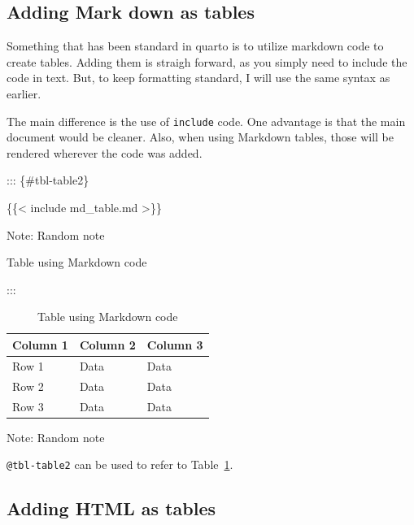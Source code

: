 \documentclass[
  12pt,
]{article}
\newenvironment{Shaded}{\begin{snugshade}}{\end{snugshade}}
\newcommand{\NormalTok}[1]{\textcolor[rgb]{0.00,0.23,0.31}{#1}}
\begin{document}
\subsection{Adding Mark down as
tables}\label{adding-mark-down-as-tables}

Something that has been standard in quarto is to utilize markdown code
to create tables. Adding them is straigh forward, as you simply need to
include the code in text. But, to keep formatting standard, I will use
the same syntax as earlier.

The main difference is the use of \texttt{include} code. One advantage
is that the main document would be cleaner. Also, when using Markdown
tables, those will be rendered wherever the code was added.

\begin{Shaded}
\begin{Highlighting}[]
\NormalTok{::: \{\#tbl{-}table2\}}

\NormalTok{\{\{\textless{} include md\_table.md \textgreater{}\}\}}

\NormalTok{Note: Random note}

\NormalTok{Table using Markdown code}

\NormalTok{:::}
\end{Highlighting}
\end{Shaded}

\begin{longtable}[]{@{}lll@{}}

\caption{\label{tbl-table2}Table using Markdown code}

\tabularnewline

\toprule\noalign{}
Column 1 & Column 2 & Column 3 \\
\midrule\noalign{}
\endhead
\bottomrule\noalign{}
\endlastfoot
Row 1 & Data & Data \\
Row 2 & Data & Data \\
Row 3 & Data & Data \\

\end{longtable}

Note: Random note

\texttt{@tbl-table2} can be used to refer to Table~\ref{tbl-table2}.

\subsection{Adding HTML as tables}\label{adding-html-as-tables}
\end{document}
